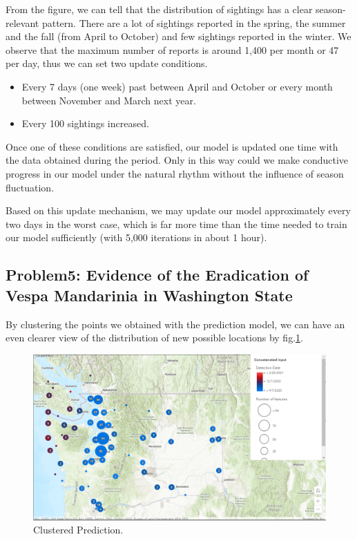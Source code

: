 \documentclass{mcmthesis}
\begin{document}
From the figure, we can tell that the distribution of sightings has a clear  season-relevant pattern. There are a lot of sightings reported in the spring, the summer and the fall (from April to October) and few sightings reported in the winter. We observe that the maximum number of reports is around 1,400 per month or 47 per day, thus we can set two update conditions. 
\begin{itemize}
	\item Every 7 days (one week) past between April and October or every month between November and March next year.
	\item Every 100 sightings increased.
\end{itemize}

Once one of these conditions are satisfied, our model is updated one time with the data obtained during the period. Only in this way could we make conductive progress in our model under the natural rhythm without the influence of season fluctuation.

Based on this update mechanism, we may update our model approximately every two days in the worst case, which is far more time than the time needed to train our model sufficiently (with 5,000 iterations in about 1 hour).

\subsection{Problem5: Evidence of the Eradication of Vespa Mandarinia in Washington State}

By clustering the points we obtained with the prediction model, we can have an even clearer view of the distribution of new possible locations by fig.\ref{fig:con}.

\begin{figure}[!htbp]
	\centering
 	\includegraphics[width = 1\textwidth]{Concatenated_Clustered.png} 
	\caption{Clustered Prediction.}
	\label{fig:con}
\end{figure}
\end{document}
